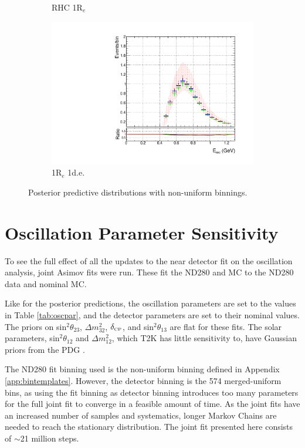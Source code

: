 \begin{figure}[!htbp]
\begin{subfigure}{.49\textwidth}
   \caption{RHC 1R$_{e}$}
  \label{fig:skppnuebar}
  \end{subfigure}
\begin{subfigure}{.49\textwidth}
  \centering
  \includegraphics[width=0.95\linewidth]{figs/polySKnue1pi}
   \caption{1R$_{e}$ 1d.e.}
  \label{fig:skppnue1pi}
\end{subfigure}
\caption{Posterior predictive \SK distributions with non-uniform binnings.}
\label{fig:skpppoly}
\end{figure}

\section{Oscillation Parameter Sensitivity}\label{sec:oscpar}

To see the full effect of all the updates to the near detector fit on the oscillation analysis, joint Asimov fits were run. These fit the ND280 and \SK MC to the ND280 data and \SK nominal MC. 

Like for the \SK posterior predictions, the oscillation parameters are set to the values in Table \ref{tab:oscpar}, and the \SK detector parameters are set to their nominal values. The priors on sin$^2\theta_{23}$, $\Delta m_{32}^2$, $\delta_{\scriptscriptstyle\mathrm{CP}}$, and sin$^2\theta_{13}$ are flat for these fits. The solar parameters, sin$^2\theta_{12}$ and $\Delta m_{12}^2$, which T2K has little sensitivity to, have Gaussian priors from the PDG \cite{pdg}.

The ND280 fit binning used is the non-uniform binning defined in Appendix \ref{app:bintemplates}. However, the detector binning is the 574 merged-uniform bins, as using the fit binning as detector binning introduces too many parameters for the full joint fit to converge in a feasible amount of time. As the joint fits have an increased number of samples and systematics, longer Markov Chains are needed to reach the stationary distribution. The joint fit presented here consists of $\sim$21 million steps. 

